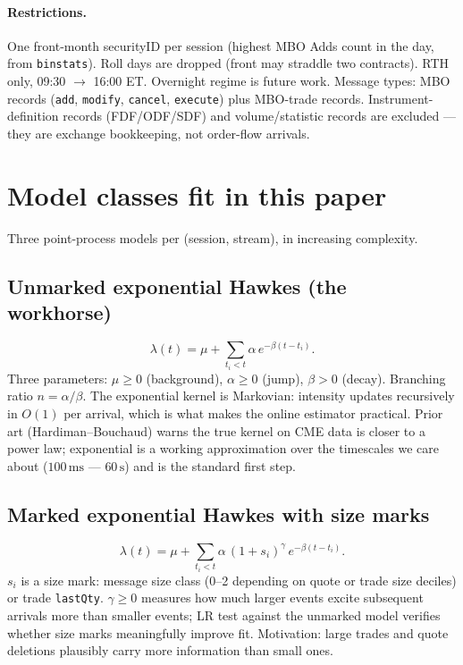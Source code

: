 \paragraph{Restrictions.} One front-month securityID per session (highest MBO Adds count in the day, from \texttt{binstats}). Roll days are dropped (front may straddle two contracts). RTH only, 09:30 $\to$ 16:00 ET. Overnight regime is future work. Message types: MBO records (\texttt{add}, \texttt{modify}, \texttt{cancel}, \texttt{execute}) plus MBO-trade records. Instrument-definition records (FDF/ODF/SDF) and volume/statistic records are excluded --- they are exchange bookkeeping, not order-flow arrivals.

\section{Model classes fit in this paper}
\label{app:models}

Three point-process models per (session, stream), in increasing complexity.

\subsection{Unmarked exponential Hawkes (the workhorse)}
\label{app:model-exp}

$$\lambda(t) = \mu + \sum_{t_i < t} \alpha\, e^{-\beta (t - t_i)}.$$
Three parameters: $\mu \geq 0$ (background), $\alpha \geq 0$ (jump), $\beta > 0$ (decay). Branching ratio $n = \alpha/\beta$. The exponential kernel is Markovian: intensity updates recursively in $O(1)$ per arrival, which is what makes the online estimator practical. Prior art (Hardiman--Bouchaud) warns the true kernel on CME data is closer to a power law; exponential is a working approximation over the timescales we care about ($100\,\mathrm{ms}$ --- $60\,\mathrm{s}$) and is the standard first step.

\subsection{Marked exponential Hawkes with size marks}
\label{app:model-marked}

$$\lambda(t) = \mu + \sum_{t_i < t} \alpha\,(1 + s_i)^\gamma\, e^{-\beta (t - t_i)}.$$
$s_i$ is a size mark: message size class (0--2 depending on quote or trade size deciles) or trade \texttt{lastQty}. $\gamma \geq 0$ measures how much larger events excite subsequent arrivals more than smaller events; LR test against the unmarked model verifies whether size marks meaningfully improve fit. Motivation: large trades and quote deletions plausibly carry more information than small ones.

